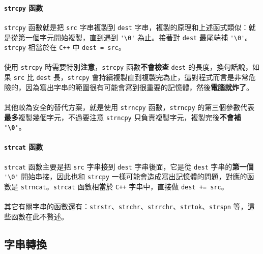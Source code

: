 \documentclass[12pt,a4paper,oneside]{report}
\begin{document}
\begin{CJK}{UTF8}{bkai}
\paragraph{\lstinline!strcpy! 函數}\lstinline!strcpy! 函數就是把 \lstinline!src! 字串複製到 \lstinline!dest! 字串，複製的原理和上述函式類似：就是從第一個字元開始複製，直到遇到 \lstinline!'\0'! 為止。接著對 \lstinline!dest! 最尾端補 \lstinline!'\0'!。\lstinline!strcpy! 相當於在 \texttt{C++} 中 \lstinline!dest = src!。
\paragraph{}使用 \lstinline!strcpy! 時需要特別{\color{blue}\textbf{注意}}，\lstinline!strcpy! 函數{\color{red}\textbf{不會檢查}} \lstinline!dest! 的長度，換句話說，如果 \lstinline!src! 比 \lstinline!dest! 長，\lstinline!strcpy! 會持續複製直到複製完為止，這對程式而言是非常危險的，因為寫出字串的範圍很有可能會寫到很重要的記憶體，然後{\color{red}\textbf{電腦就炸了}}。
\paragraph{}其他較為安全的替代方案，就是使用 \lstinline!strncpy! 函數，\lstinline!strncpy! 的第三個參數代表\textbf{最多}複製幾個字元，不過要注意 \lstinline!strncpy! 只負責複製字元，複製完後{\color{blue}\textbf{不會補 \lstinline!'\0'!}}。

\paragraph{\lstinline!strcat! 函數}\lstinline!strcat! 函數主要是把 \lstinline!src! 字串接到 \lstinline!dest! 字串後面，它是從 \lstinline!dest! 字串的\textbf{第一個} \lstinline!'\0'! 開始串接，因此也和 \lstinline!strcpy! 一樣可能會造成寫出記憶體的問題，對應的函數是 \lstinline!strncat!。\lstinline!strcat! 函數相當於 \texttt{C++} 字串中，直接做 \lstinline!dest += src!。

\paragraph{}其它有關字串的函數還有：\lstinline!strstr!、\lstinline!strchr!、\lstinline!strrchr!、\lstinline!strtok!、\lstinline!strspn! 等，這些函數在此不贅述。

\subsection{字串轉換}


\end{CJK}
\end{document}
